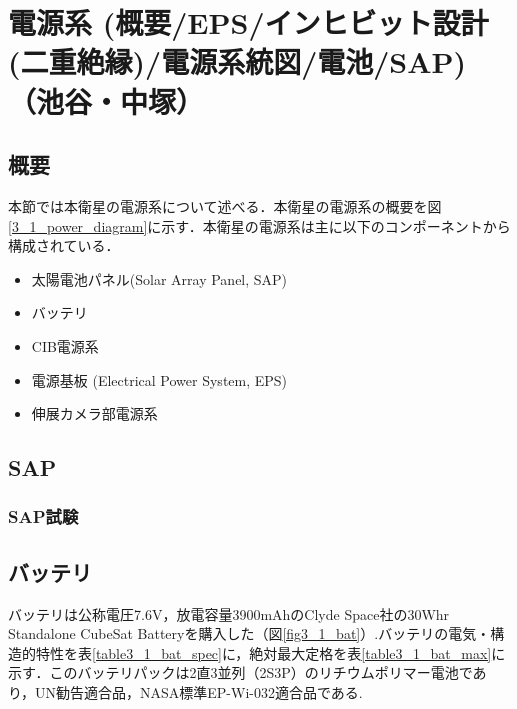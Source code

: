 \section{電源系 (概要/EPS/インヒビット設計(二重絶縁)/電源系統図/電池/SAP)（池谷・中塚）}
\subsection{概要}
本節では本衛星の電源系について述べる．本衛星の電源系の概要を図\ref{3_1_power_diagram}に示す．本衛星の電源系は主に以下のコンポーネントから構成されている．
\begin{itemize}
	\item 太陽電池パネル(Solar Array Panel, SAP)
	\item バッテリ
	\item CIB電源系
	\item 電源基板 (Electrical Power System, EPS)
	\item 伸展カメラ部電源系
\end{itemize}




\subsection{SAP}

\subsubsection{SAP試験}

\subsection{バッテリ}
バッテリは公称電圧7.6V，放電容量3900mAhのClyde Space社の30Whr　Standalone CubeSat Batteryを購入した（図\ref{fig3_1_bat}）.バッテリの電気・構造的特性を表\ref{table3_1_bat_spec}に，絶対最大定格を表\ref{table3_1_bat_max}に示す．このバッテリパックは2直3並列（2S3P）のリチウムポリマー電池であり，UN勧告適合品，NASA標準EP-Wi-032適合品である.

